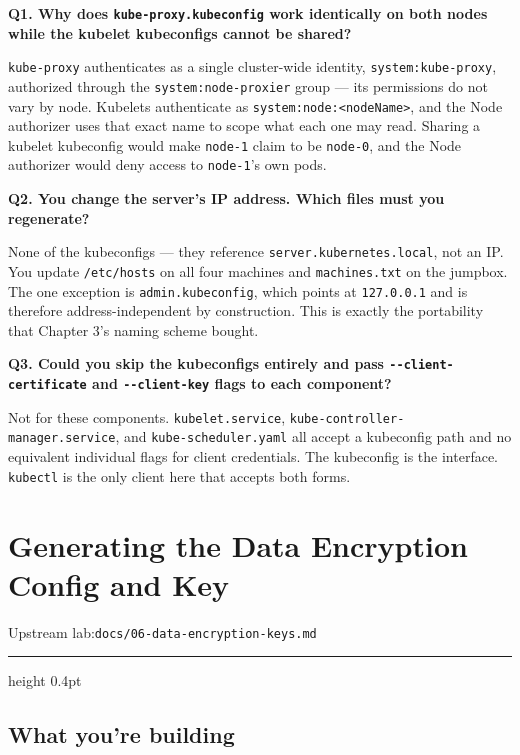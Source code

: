 \documentclass[11pt,oneside]{report}
\newcommand{\upstreamlab}[1]{%
  {\sffamily\footnotesize\color{steel}Upstream lab:\quad\texttt{#1}}\par\vspace{2pt}%
  {\color{rule}\hrule height 0.4pt}\vspace{8pt}}
\begin{document}
\textbf{Q1. Why does
\texttt{kube-}\allowbreak{}\texttt{proxy.}\allowbreak{}\texttt{kubeconfig}
work identically on
both nodes while the
kubelet kubeconfigs
cannot be shared?}

\texttt{kube-proxy}
authenticates as a
single cluster-wide
identity,
\texttt{system:}\allowbreak{}\texttt{kube-}\allowbreak{}\texttt{proxy},
authorized through
the
\texttt{system:}\allowbreak{}\texttt{node-}\allowbreak{}\texttt{proxier}
group --- its
permissions do not
vary by node.
Kubelets
authenticate as
\texttt{system:}\allowbreak{}\texttt{node:}\allowbreak{}\texttt{\textless{}nodeName\textgreater{}},
and the Node
authorizer uses that
exact name to scope
what each one may
read. Sharing a
kubelet kubeconfig
would make
\texttt{node-1}
claim to be
\texttt{node-0}, and
the Node authorizer
would deny access to
\texttt{node-1}'s
own pods.

\textbf{Q2. You
change the server's
IP address. Which
files must you
regenerate?}

None of the
kubeconfigs --- they
reference
\texttt{server.}\allowbreak{}\texttt{kubernetes.}\allowbreak{}\texttt{local},
not an IP. You
update
\texttt{/etc/hosts}
on all four machines
and
\texttt{machines.txt}
on the jumpbox. The
one exception is
\texttt{admin.}\allowbreak{}\texttt{kubeconfig},
which points at
\texttt{127.0.0.1}
and is therefore
address-independent
by construction.
This is exactly the
portability that
Chapter 3's naming
scheme bought.

\textbf{Q3. Could
you skip the
kubeconfigs entirely
and pass
\texttt{-\/-client-}\allowbreak{}\texttt{certificate}
and
\texttt{-\/-client-key}
flags to each
component?}

Not for these
components.
\texttt{kubelet.service},
\texttt{kube-}\allowbreak{}\texttt{controller-}\allowbreak{}\texttt{manager.}\allowbreak{}\texttt{service},
and
\texttt{kube-}\allowbreak{}\texttt{scheduler.}\allowbreak{}\texttt{yaml}
all accept a
kubeconfig path and
no equivalent
individual flags for
client credentials.
The kubeconfig is
the interface.
\texttt{kubectl} is
the only client here
that accepts both
forms.

\hypertarget{chap-6}{%
\chapter{Generating
the Data Encryption
Config and
Key}\label{chap-6}}

\upstreamlab{docs/06-data-encryption-keys.md}

\hypertarget{what-youre-building-6}{%
\section{What you're
building}\label{what-youre-building-6}}
\end{document}
